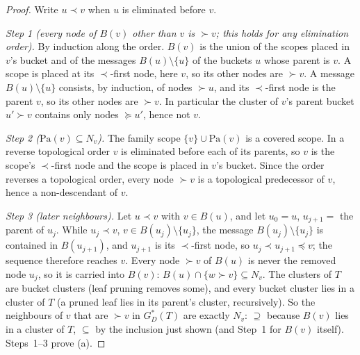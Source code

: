 \documentclass{article} %
\providecommand{\Pa}{\mathrm{Pa}}
\begin{document}
\begin{proof}
Write $u\prec v$ when $u$ is eliminated before $v$.

\emph{Step 1 (every node of $B(v)$ other than $v$ is $\succ v$; this holds for any
elimination order).} By induction along the order. $B(v)$ is the union of the
scopes placed in $v$'s bucket and of the messages $B(u)\setminus\{u\}$ of the
buckets $u$ whose parent is $v$. A scope is placed at its $\prec$-first node,
here $v$, so its other nodes are $\succ v$. A message $B(u)\setminus\{u\}$ consists,
by induction, of nodes $\succ u$, and its $\prec$-first node is the parent $v$, so its
other nodes are $\succ v$. In particular the cluster of $v$'s parent bucket $u'\succ v$
contains only nodes $\succeq u'$, hence not $v$.

\emph{Step 2 ($\Pa(v)\subseteq N_v$).} The family scope $\{v\}\cup\Pa(v)$ is a
covered scope. In a reverse topological order $v$ is eliminated before each of
its parents, so $v$ is the scope's $\prec$-first node and the scope is placed in
$v$'s bucket. Since the order reverses a topological order, every node $\succ v$ is
a topological predecessor of $v$, hence a non-descendant of $v$.

\emph{Step 3 (later neighbours).} Let $u\prec v$ with $v\in B(u)$, and let
$u_0=u$, $u_{j+1}=$ the parent of $u_j$. While $u_j\prec v$, $v\in B(u_j)\setminus\{u_j\}$,
the message $B(u_j)\setminus\{u_j\}$ is contained in $B(u_{j+1})$, and $u_{j+1}$ is
its $\prec$-first node, so $u_j\prec u_{j+1}\preceq v$; the sequence therefore
reaches $v$. Every node $\succ v$ of $B(u)$ is never the removed node $u_j$, so it
is carried into $B(v)$: $B(u)\cap\{w\succ v\}\subseteq N_v$. The clusters of $T$ are
bucket clusters (leaf pruning removes some), and every bucket cluster lies in a
cluster of $T$ (a pruned leaf lies in its parent's cluster, recursively). So the
neighbours of $v$ that are $\succ v$ in $G^\ast_D(T)$ are exactly $N_v$: $\supseteq$
because $B(v)$ lies in a cluster of $T$, $\subseteq$ by the inclusion just shown
(and Step~1 for $B(v)$ itself). Steps~1--3 prove (a).


\end{proof}
\end{document}
